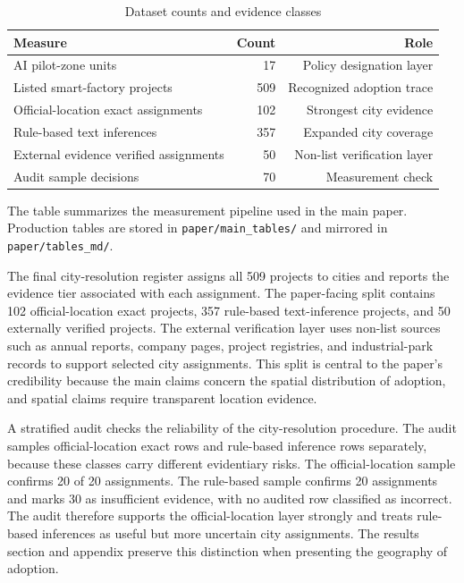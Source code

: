 \documentclass[12pt]{article}
\begin{document}
\begin{table}[t]
\centering
\caption{Dataset counts and evidence classes}
\label{tab:dataset_counts}
\begin{threeparttable}
\begin{tabular}{lrr}
\toprule
Measure & Count & Role \\
\midrule
AI pilot-zone units & 17 & Policy designation layer \\
Listed smart-factory projects & 509 & Recognized adoption trace \\
Official-location exact assignments & 102 & Strongest city evidence \\
Rule-based text inferences & 357 & Expanded city coverage \\
External evidence verified assignments & 50 & Non-list verification layer \\
Audit sample decisions & 70 & Measurement check \\
\bottomrule
\end{tabular}
\begin{tablenotes}
\item The table summarizes the measurement pipeline used in the main paper. Production tables are stored in \texttt{paper/main\_tables/} and mirrored in \texttt{paper/tables\_md/}.
\end{tablenotes}
\end{threeparttable}
\end{table}

The final city-resolution register assigns all 509 projects to cities and reports the evidence tier associated with each assignment. The paper-facing split contains 102 official-location exact projects, 357 rule-based text-inference projects, and 50 externally verified projects. The external verification layer uses non-list sources such as annual reports, company pages, project registries, and industrial-park records to support selected city assignments. This split is central to the paper's credibility because the main claims concern the spatial distribution of adoption, and spatial claims require transparent location evidence.

A stratified audit checks the reliability of the city-resolution procedure. The audit samples official-location exact rows and rule-based inference rows separately, because these classes carry different evidentiary risks. The official-location sample confirms 20 of 20 assignments. The rule-based sample confirms 20 assignments and marks 30 as insufficient evidence, with no audited row classified as incorrect. The audit therefore supports the official-location layer strongly and treats rule-based inferences as useful but more uncertain city assignments. The results section and appendix preserve this distinction when presenting the geography of adoption.
\end{document}
